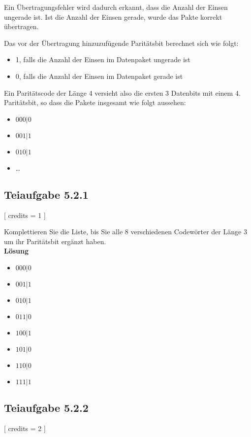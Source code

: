 \documentclass[12pt]{article}
\begin{document}
 Ein Übertragungsfehler wird dadurch erkannt, dass die Anzahl der Einsen ungerade ist. Ist die Anzahl der Einsen gerade, wurde das Pakte korrekt übertragen. 
  
 Das vor der Übertragung hinzuzufügende Paritätsbit berechnet sich wie folgt:  
  
 \begin{itemize} 
 \item 1, falls die Anzahl der Einsen im Datenpaket ungerade ist 
 \item 0, falls die Anzahl der Einsen im Datenpaket gerade ist 
 \end{itemize} 
  
 Ein Paritätscode der Länge 4 versieht also die ersten 3 Datenbits mit einem 4. Paritätsbit, so dass die Pakete insgesamt wie folgt aussehen:  
  
 \begin{itemize} 
 \item $000|0$ 
 \item $001|1$ 
 \item $010|1$ 
 \item \ldots 
 \end{itemize} 
  
  
 \subsection*{Teiaufgabe 5.2.1}[ 
 credits = 1  
 ] 
  
 Komplettieren Sie die Liste, bis Sie alle 8 verschiedenen Codewörter der Länge 3 um ihr Paritätsbit ergänzt haben. \\ 
  
  \textbf{Lösung}\\
    
 \begin{itemize} 
 \item $000|0$ 
 \item $001|1$ 
 \item $010|1$ 
 \item $011|0$
 \item $100|1$
 \item $101|0$
 \item $110|0$
 \item $111|1$
 \end{itemize}
  
 \subsection*{Teiaufgabe 5.2.2}[ 
 credits = 2  
 ] 
  
\end{document}
